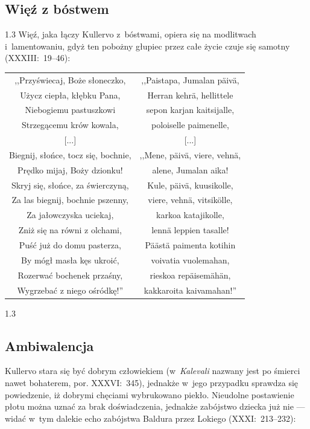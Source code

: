 \documentclass[11pt,a4paper,twoside]{report}
\begin{document}
\subsection*{Więź z bóstwem}
\begin{spacing}{1.3}
Więź, jaka łączy Kullervo z~bóstwami, opiera się na modlitwach i~lamentowaniu, gdyż ten pobożny głupiec przez całe życie czuje się samotny (XXXIII:~19--46):
\end{spacing}
{\centering
\small
\begin{longtable}{c c}
,,Przyświecaj, Boże słoneczko, & ,,Paistapa, Jumalan päivä, \\
Użycz ciepła, kłębku Pana, & Herran kehrä, hellittele \\
Niebogiemu pastuszkowi & sepon karjan kaitsijalle,\\
Strzegącemu krów kowala, & poloiselle paimenelle,\\
{[...]} & {[...]} \\
Biegnij, słońce, tocz się, bochnie, & ,,Mene, päivä, viere, vehnä, \\
Prędko mijaj, Boży dzionku! & alene, Jumalan aika! \\
Skryj się, słońce, za świerczyną, & Kule, päivä, kuusikolle, \\
Za las biegnij, bochnie pszenny, & viere, vehnä, vitsikölle, \\
Za jałowczyska uciekaj, & karkoa katajikolle, \\
Zniż się na równi z olchami, & lennä leppien tasalle! \\
Puść już do domu pasterza, & Päästä paimenta kotihin \\
By mógł masła kęs ukroić, & voivatia vuolemahan, \\
Rozerwać bochenek przaśny, & rieskoa repäisemähän, \\
Wygrzebać z niego ośródkę!'' & kakkaroita kaivamahan!'' \\
\end{longtable}
}
\begin{spacing}{1.3}
\vspace*{0.5\baselineskip}
\subsection*{Ambiwalencja}

Kullervo stara się być dobrym człowiekiem (w~\emph{Kalevali} nazwany jest po śmierci nawet bohaterem, por. XXXVI:~345), jednakże w~jego przypadku sprawdza się powiedzenie, iż dobrymi chęciami wybrukowano piekło. Nieudolne postawienie płotu można uznać za brak doświadczenia, jednakże zabójstwo dziecka już nie --- widać w~tym dalekie echo zabójstwa Baldura przez Lokiego (XXXI:~213--232):
\end{spacing}
\end{document}
